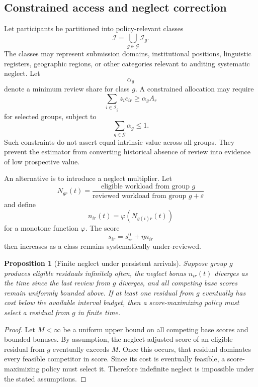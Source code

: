 \documentclass[11pt]{article}
\newtheorem{proposition}[definition]{Proposition}
\theoremstyle{definition}
\newcommand{\eps}{\varepsilon}
\begin{document}
\subsection{Constrained access and neglect correction}

Let participants be partitioned into policy-relevant classes
\[
\mathcal{I}
=
\bigcup_{g\in\mathcal{G}}\mathcal{I}_g.
\]
The classes may represent submission domains, institutional positions, linguistic registers, geographic regions, or other categories relevant to auditing systematic neglect. Let
\[
\alpha_g
\]
denote a minimum review share for class \(g\). A constrained allocation may require
\[
\sum_{i\in\mathcal{I}_g}z_i c_{ir}
\geq
\alpha_g A_r
\]
for selected groups, subject to
\[
\sum_{g\in\mathcal{G}}\alpha_g\leq1.
\]
Such constraints do not assert equal intrinsic value across all groups. They prevent the estimator from converting historical absence of review into evidence of low prospective value.

An alternative is to introduce a neglect multiplier. Let
\[
N_{gr}(t)
=
\frac{
\text{eligible workload from group }g
}{
\text{reviewed workload from group }g+\eps
}
\]
and define
\[
n_{ir}(t)
=
\varphi\!\left(N_{g(i)r}(t)\right)
\]
for a monotone function \(\varphi\). The score
\[
s_{ir}
=
s_{ir}^{0}
+
\eta n_{ir}
\]
then increases as a class remains systematically under-reviewed.

\begin{proposition}[Finite neglect under persistent arrivals]
Suppose group \(g\) produces eligible residuals infinitely often, the neglect bonus \(n_{ir}(t)\) diverges as the time since the last review from \(g\) diverges, and all competing base scores remain uniformly bounded above. If at least one residual from \(g\) eventually has cost below the available interval budget, then a score-maximizing policy must select a residual from \(g\) in finite time.
\end{proposition}

\begin{proof}
Let \(M<\infty\) be a uniform upper bound on all competing base scores and bounded bonuses. By assumption, the neglect-adjusted score of an eligible residual from \(g\) eventually exceeds \(M\). Once this occurs, that residual dominates every feasible competitor in score. Since its cost is eventually feasible, a score-maximizing policy must select it. Therefore indefinite neglect is impossible under the stated assumptions.
\end{proof}
\end{document}

